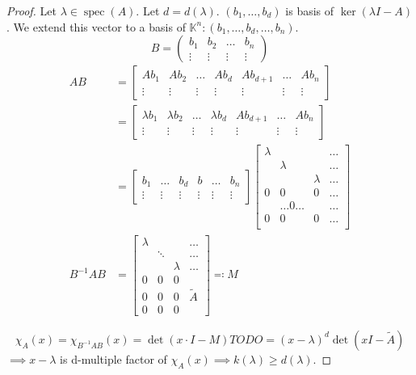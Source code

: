 \documentclass{article}
\begin{document}
\begin{proof}
  Let $\lambda \in \operatorname{spec}(A)$. Let $d = d(\lambda)$. $(b_1, \dots, b_d)$ is basis of $\ker(\lambda I - A)$.
  We extend this vector to a basis of $\mathbb K^n:  (b_1, \dots, b_d, \dots, b_n)$.
  \[ B = \begin{pmatrix} b_1 & b_2 & \dots & b_n \\ \vdots & \vdots & \vdots & \vdots \end{pmatrix} \]
  \begin{align*}
    AB &= \begin{bmatrix} Ab_1 & Ab_2 & \dots & Ab_d & Ab_{d+1} & \dots & Ab_n \\ \vdots & \vdots & \vdots & \vdots & \vdots & \vdots & \vdots \end{bmatrix} \\
       &= \begin{bmatrix} \lambda b_1 & \lambda b_2 & \dots & \lambda b_d & Ab_{d+1} & \dots & Ab_n \\ \vdots & \vdots & \vdots & \vdots & \vdots & \vdots & \vdots \end{bmatrix} \\
       &= \begin{bmatrix} b_1 & \dots & b_d & b & \dots & b_n \\ \vdots & \vdots & \vdots & \vdots & \vdots & \vdots \end{bmatrix} \begin{bmatrix} \lambda & & & \dots \\ & \lambda & & \dots \\ & & \lambda & \dots \\ 0 & 0 & 0 & \dots \\   & \dots 0 \dots &   & \dots \\ 0 & 0 & 0 & \dots \\ \end{bmatrix} \\
    B^{-1}AB &= \begin{bmatrix} \lambda & & & \dots \\ & \ddots & & \dots \\ & & \lambda & \dots \\ 0 & 0 & 0 & \\ 0 & 0 & 0 & \tilde A \\ 0 & 0 & 0 & \end{bmatrix} \eqqcolon M
  \end{align*}

  \[ \chi_A(x) = \chi_{B^{-1} AB}(x) = \det(x \cdot I - M) TODO = (x - \lambda)^d \det(xI - \tilde A) \]
  $\implies x - \lambda$ is d-multiple factor of $\chi_A(x) \implies k(\lambda) \geq d(\lambda)$.
\end{proof}

\printindex
\end{document}

